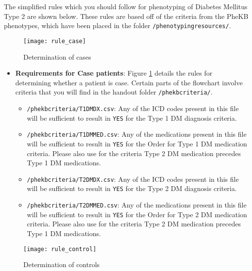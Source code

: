 \documentclass[12pt]{article}
\begin{document}
The simplified rules which you should follow for phenotyping of Diabetes Mellitus Type 2 are shown below. These rules are based off of the criteria from the PheKB phenotypes, which have been placed in the folder \texttt{/phenotyping\textunderscore resources/}.

\begin{figure}[!h]
  \centering
  \texttt{[image: rule\_case]}
  \caption{Determination of cases}
  \label{fig:rule_case}
\end{figure}

\begin{itemize}
\item \textbf{Requirements for Case patients}: Figure \ref{fig:rule_case} details the rules for determining whether a patient is case. Certain parts of the flowchart involve criteria that you will find in the handout folder \texttt{/phekb\textunderscore criteria/}.
\begin{itemize}
\item \texttt{/phekb\textunderscore criteria/T1DM\textunderscore DX.csv}: Any of the ICD codes present in this file will be sufficient to result in \texttt{YES} for the Type 1 DM diagnosis criteria.
\item \texttt{/phekb\textunderscore criteria/T1DM\textunderscore MED.csv}: Any of the medications present in this file will be sufficient to result in \texttt{YES} for the Order for Type 1 DM medication criteria. Please also use for the criteria Type 2 DM medication precedes Type 1 DM medications.
\item \texttt{/phekb\textunderscore criteria/T2DM\textunderscore DX.csv}: Any of the ICD codes present in this file will be sufficient to result in \texttt{YES} for the Type 2 DM diagnosis criteria.
\item \texttt{/phekb\textunderscore criteria/T2DM\textunderscore MED.csv}: Any of the medications present in this file will be sufficient to result in \texttt{YES} for the Order for Type 2 DM medication criteria. Please also use for the criteria Type 2 DM medication precedes Type 1 DM medications.
\end{itemize}
\end{itemize}

\begin{figure}[!h]
  \centering
  \texttt{[image: rule\_control]}
  \caption{Determination of controls}
  \label{fig:rule_control}
\end{figure}
\end{document}
